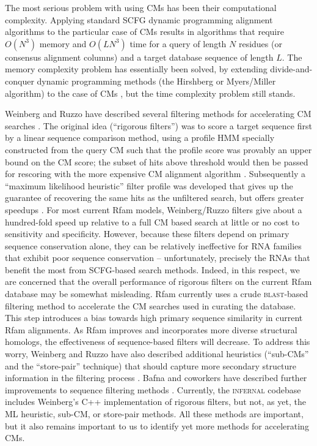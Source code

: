 \documentclass[11pt]{article}
\begin{document}
The most serious problem with using CMs has been their computational
complexity. Applying standard SCFG dynamic programming alignment
algorithms to the particular case of CMs results in algorithms that
require $O(N^3)$ memory and $O(L N^3)$ time for a query of length $N$
residues (or consensus alignment columns) and a target database
sequence of length $L$.  The memory complexity problem has essentially
been solved, by extending divide-and-conquer dynamic programming
methods (the Hirshberg or Myers/Miller algorithm) to the case of CMs
\cite{Eddy02b}, but the time complexity problem still stands.

Weinberg and Ruzzo have described several filtering methods for
accelerating CM searches
\cite{WeinbergRuzzo04,WeinbergRuzzo04b,WeinbergRuzzo06}. The original
idea (``rigorous filters'') was to score a target sequence first by a
linear sequence comparison method, using a profile HMM specially
constructed from the query CM such that the profile score was provably
an upper bound on the CM score; the subset of hits above threshold
would then be passed for rescoring with the more expensive CM
alignment algorithm \cite{WeinbergRuzzo04b}.  Subsequently a ``maximum
likelihood heuristic'' filter profile was developed that gives up the
guarantee of recovering the same hits as the unfiltered search, but
offers greater speedups \cite{WeinbergRuzzo06}.  For most current Rfam
models, Weinberg/Ruzzo filters give about a hundred-fold speed up
relative to a full CM based search at little or no cost to sensitivity
and specificity. However, because these filters depend on primary
sequence conservation alone, they can be relatively ineffective for
RNA families that exhibit poor sequence conservation -- unfortunately,
precisely the RNAs that benefit the most from SCFG-based search
methods.  Indeed, in this respect, we are concerned that the overall
performance of rigorous filters on the current Rfam database may be
somewhat misleading. Rfam currently uses a crude \textsc{blast}-based
filtering method to accelerate the CM searches used in curating the
database. This step introduces a bias towards high primary sequence
similarity in current Rfam alignments. As Rfam improves and
incorporates more diverse structural homologs, the effectiveness of
sequence-based filters will decrease. To address this worry, Weinberg
and Ruzzo have also described additional heuristics (``sub-CMs'' and
the ``store-pair'' technique) that should capture more secondary
structure information in the filtering process
\cite{WeinbergRuzzo04}. Bafna and coworkers have described further
improvements to sequence filtering methods \cite{ZhangBafna06}.
Currently, the \textsc{infernal} codebase includes Weinberg's C++
implementation of rigorous filters, but not, as yet, the ML heuristic,
sub-CM, or store-pair methods.  All these methods are important, but
it also remains important to us to identify yet more methods for
accelerating CMs.
\end{document}

